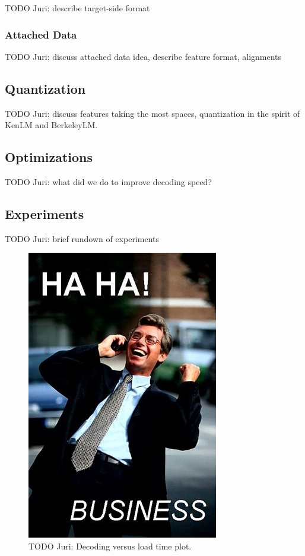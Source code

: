 \documentclass[11pt]{article}
\begin{document}
TODO Juri: describe target-side format

\subsubsection{Attached Data}

TODO Juri: discuss attached data idea, describe feature format,
alignments

\subsection{Quantization}

TODO Juri: discuss features taking the most spaces, quantization in
the spirit of KenLM and BerkeleyLM.

\subsection{Optimizations}

TODO Juri: what did we do to improve decoding speed?

\subsection{Experiments}

TODO Juri: brief rundown of experiments

\begin{figure}[!t]
\begin{center}
\includegraphics[width=0.4\linewidth]{figures/placeholder.jpeg}
\end{center}
\caption{TODO Juri: Decoding versus load time plot.}
\label{fig-example-compression}
\end{figure}
\end{document}
